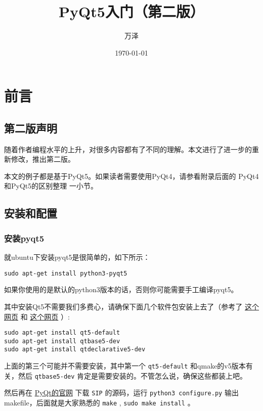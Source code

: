 \documentclass[11pt,oneside]{article}
\author{万泽}
\date{\today}
\title{PyQt5入门（第二版）}
\begin{document}
\maketitle
\tableofcontents

\setcounter{secnumdepth}{0}



\section{前言}
\label{sec:orgheadline5}
\subsection{第二版声明}
\label{sec:orgheadline1}
随着作者编程水平的上升，对很多内容都有了不同的理解。本文进行了进一步的重新修改，推出第二版。

本文的例子都是基于PyQt5。如果读者需要使用PyQt4，请参看附录后面的 PyQt4和PyQt5的区别整理 一小节。

\subsection{安装和配置}
\label{sec:orgheadline4}
\subsubsection{安装pyqt5}
\label{sec:orgheadline2}
就ubuntu下安装pyqt5是很简单的，如下所示：
\begin{verbatim}
sudo apt-get install python3-pyqt5
\end{verbatim}
如果你使用的是默认的python3版本的话，否则你可能需要手工编译pyqt5。

其中安装Qt5不需要我们多费心，请确保下面几个软件包安装上去了（参考了 \href{http://askubuntu.com/questions/508503/whats-the-development-package-for-qt5-in-14-04}{这个网页} 和 \href{http://askubuntu.com/questions/609238/error-pyqt5-requires-qt-v5-0-or-later}{这个网页} ）:
\begin{Verbatim}
sudo apt-get install qt5-default
sudo apt-get install qtbase5-dev
sudo apt-get install qtdeclarative5-dev
\end{Verbatim}

上面的第三个可能并不需要安装，其中第一个 \texttt{qt5-default} 和qmake的v5版本有关，然后 \texttt{qtbase5-dev} 肯定是需要安装的。不管怎么说，确保这些都装上吧。

然后再在 \href{https://www.riverbankcomputing.com/news}{PyQt的官网} 下载 \texttt{SIP} 的源码，运行 \texttt{python3 configure.py} 输出makefile，后面就是大家熟悉的 \texttt{make} , \texttt{sudo make install} 。
\end{document}
